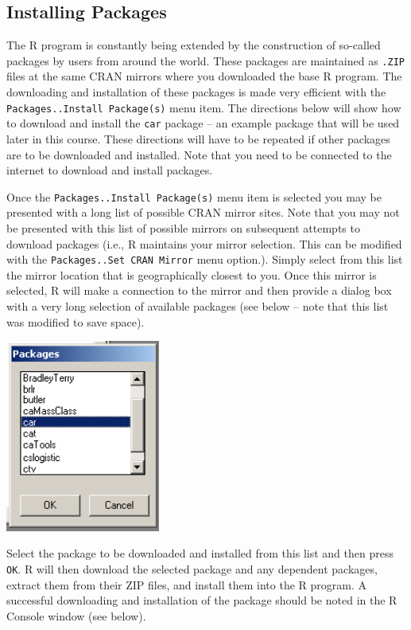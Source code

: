 \documentclass[a4paper]{article}
\begin{document}
\subsection{Installing Packages}  \label{sect:RPkgInstall}
The R program is constantly being extended by the construction of so-called packages by users from around the world.  These packages are maintained as \verb".ZIP" files at the same CRAN mirrors where you downloaded the base R program.  The downloading and installation of these packages is made very efficient with the \verb"Packages..Install Package(s)" menu item.  The directions below will show how to download and install the \verb"car" package -- an example package that will be used later in this course.  These directions will have to be repeated if other packages are to be downloaded and installed.  Note that you need to be connected to the internet to download and install packages.

Once the \verb"Packages..Install Package(s)" menu item is selected you may be presented with a long list of possible CRAN mirror sites.  Note that you may not be presented with this list of possible mirrors on subsequent attempts to download packages (i.e., R maintains your mirror selection.  This can be modified with the \verb"Packages..Set CRAN Mirror" menu option.).  Simply select from this list the mirror location that is geographically closest to you.  Once this mirror is selected, R will make a connection to the mirror and then provide a dialog box with a very long selection of available packages (see below -- note that this list was modified to save space).

\begin{center}
  \includegraphics[width=2in]{Figs/Install_Pkg_1.jpg}
\end{center}

Select the package to be downloaded and installed from this list and then press \verb"OK".  R will then download the selected package and any dependent packages, extract them from their ZIP files, and install them into the R program.  A successful downloading and installation of the package should be noted in the R Console window (see below).
\end{document}
